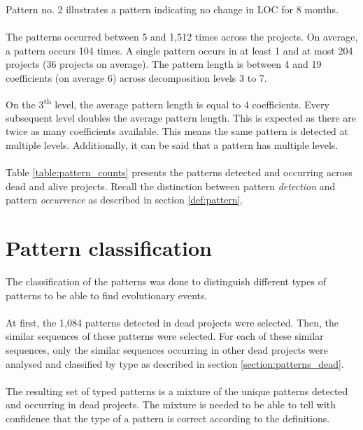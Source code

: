 

\noindent
Pattern no. 2 illustrates a pattern indicating no change in LOC for 8 months.

\paragraph{}
The patterns occurred between 5 and 1,512 times across the projects. On
average, a pattern occurs 104 times. A single pattern occurs in at least 1 and
at most 204 projects (36 projects on average). The pattern length is between 4
and 19 coefficients (on average 6) across decomposition levels 3 to 7.

On the 3\textsuperscript{th} level, the average pattern length is equal to 4
coefficients. Every subsequent level doubles the average pattern length. This
is expected as there are twice as many coefficients available. This means the
same pattern is detected at multiple levels. Additionally, it can be said that
a pattern has multiple levels.

\paragraph{}
Table \ref{table:pattern_counts} presents the patterns detected and occurring
across dead and alive projects. Recall the distinction between pattern
\emph{detection }\rm and pattern \emph{occurrence }\rm as described in section
\ref{def:pattern}.



\section{Pattern classification}
The classification of the patterns was done to distinguish different types of
patterns to be able to find evolutionary events.

\paragraph{}
At first, the 1,084 patterns detected in dead projects were selected. Then, the
similar sequences of these patterns were selected. For each of these similar
sequences, only the similar sequences occurring in other dead projects were
analysed and classified by type as described in section
\ref{section:patterns_dead}.

\paragraph{}
The resulting set of typed patterns is a mixture of the unique patterns detected
and occurring in dead projects. The mixture is needed to be able to tell with
confidence that the type of a pattern is correct according to the definitions.


